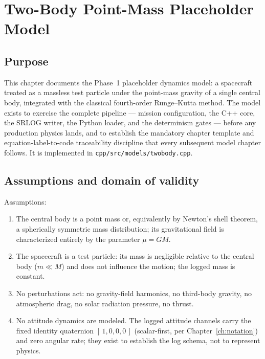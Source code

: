 \chapter{Two-Body Point-Mass Placeholder Model}
\label{ch:twobody}

\section{Purpose}
\label{sec:twobody:purpose}

This chapter documents the Phase~1 placeholder dynamics model: a spacecraft
treated as a massless test particle under the point-mass gravity of a single
central body, integrated with the classical fourth-order Runge--Kutta method.
The model exists to exercise the complete pipeline --- mission configuration,
the C++ core, the SRLOG writer, the Python loader, and the determinism gates
--- before any production physics lands, and to establish the mandatory
chapter template and equation-label-to-code traceability discipline that every
subsequent model chapter follows. It is implemented in
\texttt{cpp/src/models/twobody.cpp}.

\section{Assumptions and domain of validity}
\label{sec:twobody:domain}

Assumptions:
\begin{enumerate}
  \item The central body is a point mass or, equivalently by Newton's shell
    theorem, a spherically symmetric mass distribution; its gravitational
    field is characterized entirely by the parameter $\mu = GM$.
  \item The spacecraft is a test particle: its mass is negligible relative to
    the central body ($m \ll M$) and does not influence the motion; the
    logged mass is constant.
  \item No perturbations act: no gravity-field harmonics, no third-body
    gravity, no atmospheric drag, no solar radiation pressure, no thrust.
  \item No attitude dynamics are modeled. The logged attitude channels carry
    the fixed identity quaternion $[\,1, 0, 0, 0\,]$ (scalar-first, per
    Chapter~\ref{ch:notation}) and zero angular rate; they exist to establish
    the log schema, not to represent physics.
\end{enumerate}

